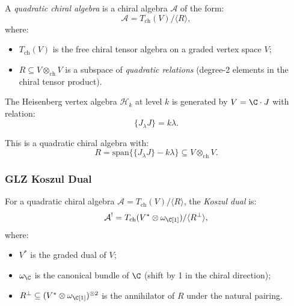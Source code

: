 \begin{definition}
\label{def:quadratic_chiral}
A \emph{quadratic chiral algebra} is a chiral algebra $\mathcal{A}$ of the form:
\begin{equation}
\mathcal{A} = T_{\text{ch}}(V) / \langle R \rangle,
\end{equation}
where:
\begin{itemize}
\item $T_{\text{ch}}(V)$ is the free chiral tensor algebra on a graded vertex space $V$;
\item $R \subseteq V \otimes_{\text{ch}} V$ is a subspace of \emph{quadratic relations} (degree-2 elements in the chiral tensor product).
\end{itemize}
\end{definition}

\begin{example}
\label{ex:Heisenberg_quadratic}
The Heisenberg vertex algebra $\mathcal{H}_k$ at level $k$ is generated by $V = \C \cdot J$ with relation:
\begin{equation}
\{J_\lambda J\} = k\lambda.
\end{equation}

This is a quadratic chiral algebra with:
\begin{equation}
R = \text{span}\big\{\{J_\lambda J\} - k\lambda\big\} \subseteq V \otimes_{\text{ch}} V.
\end{equation}
\end{example}

\subsubsection{GLZ Koszul Dual}

\begin{definition}
\label{def:GLZ_Koszul}
For a quadratic chiral algebra $\mathcal{A} = T_{\text{ch}}(V) / \langle R \rangle$, the \emph{Koszul dual} is:
\begin{equation}
\mathcal{A}^! = T_{\text{ch}}(V^* \otimes \omega_\C[1]) / \langle R^\perp \rangle,
\end{equation}
where:
\begin{itemize}
\item $V^*$ is the graded dual of $V$;
\item $\omega_\C$ is the canonical bundle of $\C$ (shift by 1 in the chiral direction);
\item $R^\perp \subseteq (V^* \otimes \omega_\C[1])^{\otimes 2}$ is the annihilator of $R$ under the natural pairing.
\end{itemize}
\end{definition}

